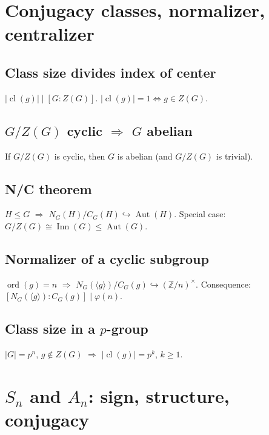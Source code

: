 \medskip

\section{Conjugacy classes, normalizer, centralizer}
\label{sec:conjugacy}

\subsection{Class size divides index of center}
\label{subsec:class-size-center}

$|\operatorname{cl}(g)|\mid[G:Z(G)]$. $|\operatorname{cl}(g)|=1 \iff g\in Z(G)$.

\subsection{$G/Z(G)$ cyclic $\Rightarrow$ $G$ abelian}
\label{subsec:gz-cyclic}

If $G/Z(G)$ is cyclic, then $G$ is abelian (and $G/Z(G)$ is trivial).

\subsection{N/C theorem}
\label{subsec:nc-theorem}

$H\le G$ $\Rightarrow$ $N_G(H)/C_G(H)\hookrightarrow\operatorname{Aut}(H)$. Special case: $G/Z(G)\cong\operatorname{Inn}(G)\le\operatorname{Aut}(G)$.

\subsection{Normalizer of a cyclic subgroup}
\label{subsec:normalizer-cyclic}

$\operatorname{ord}(g)=n$ $\Rightarrow$ $N_G(\langle g\rangle)/C_G(g)\hookrightarrow(\mathbb{Z}/n)^\times$. Consequence: $[N_G(\langle g\rangle):C_G(g)]\mid\varphi(n)$.

\subsection{Class size in a $p$-group}
\label{subsec:class-size-pgroup}

$|G|=p^n$, $g\notin Z(G)$ $\Rightarrow$ $|\operatorname{cl}(g)|=p^k$, $k\ge1$.

\medskip

\section{$S_n$ and $A_n$: sign, structure, conjugacy}
\label{sec:sn-an}

